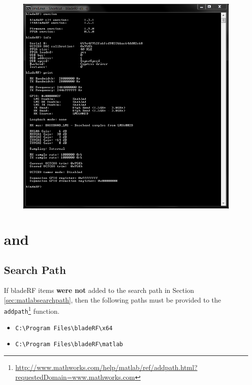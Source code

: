 {\begin{figure}[h]
  \centering
  \includegraphics[width=6in]{images/windows/bladeRF-cli/cli-info.png}
\end{figure}

\newpage
\section{\matlab and \simulink}

\subsection{\matlab Search Path}

If bladeRF items \textbf{were not} added to the \matlab search path in Section
\ref{sec:matlabsearchpath}, then the following paths must be provided to
the \texttt{addpath}\footnote{\url{http://www.mathworks.com/help/matlab/ref/addpath.html?requestedDomain=www.mathworks.com}} function.

\begin{itemize}
  \item \texttt{C:\textbackslash Program Files\textbackslash bladeRF\textbackslash x64}
  \item \texttt{C:\textbackslash Program Files\textbackslash bladeRF\textbackslash matlab}
\end{itemize}

}
